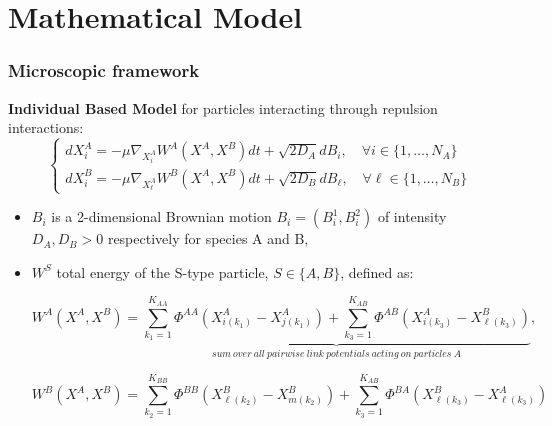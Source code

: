 \documentclass[10pt]{beamer}
\def \l {{\ell}}
\def \PAA {{\Phi^{AA}}}
\def \PBB {{\Phi^{BB}}}
\def \PAB {{\Phi^{AB}}}
\def \PBA {{\Phi^{BA}}}
\newcommand\Fontvii{\fontsize{9}{7.2}\selectfont}
\begin{document}
\section{Mathematical Model}
\begin{frame}
\frametitle{Microscopic framework}
\Fontvii

\textbf{Individual Based Model} for particles interacting through repulsion interactions:
\begin{equation}
	\begin{cases}
d X_i^{A}=-\mu \nabla_{X_{i}^{A}}W^{A}(X^{A},X^{B})dt + \sqrt{2D_{A}} d B_{i}, \quad \forall i \in\{1, \dots, N_{A}\}
\\
d X_i^{B}=-\mu \nabla_{X_{\l}^{A}}W^{B}(X^{A},X^{B})dt + \sqrt{2D_{B}} d B_{\ell}, \quad \forall \l \in \{1, \dots, N_{B}\}
\end{cases}
\end{equation}
\begin{itemize}
\item  $B_i$ is a 2-dimensional Brownian motion $B_i=(B_i^1,B_i^2)$ of intensity $D_A,D_B>0$ respectively for species A and B,
\item $W^S$ total energy of the S-type particle, $S \in \{ A,B \}$, defined as:  

 $$ W^{A}(X^{A},X^{B})=\underbrace{\sum_{k_1=1}^{K_{AA}} \PAA(X^{A}_{i(k_1)}-X^{A}_{j(k_1)})+
\sum_{k_3=1}^{K_{AB}} \PAB(X^{A}_{i(k_3)}-X^{B}_{\l(k_3)})}_{sum \ over \ all \ pairwise \ link \ potentials \ acting \ on \ particles \ A},  $$

$$ W^{B}(X^{A},X^{B})=\sum_{k_2=1}^{K_{BB}} \PBB(X^{B}_{\l(k_2)}-X^{B}_{m(k_2)})+
\sum_{k_3=1}^{K_{AB}} \PBA(X^{B}_{\l(k_3)}-X^{A}_{\l(k_3)}) $$

\end{itemize}
\end{frame}
\end{document}
